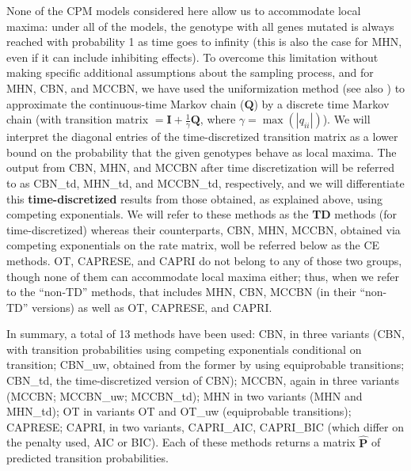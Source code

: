 \documentclass[a4paper,10pt]{article}
\newcommand{\idea}[1]{\textcolor{red}{#1}}
\begin{document}
None of the CPM models considered here allow us to accommodate local
maxima: under all of the models, the genotype with all genes mutated is
always reached with probability 1 as time goes to infinity (this is also
the case for MHN, even if it can include inhibiting effects). To overcome
this limitation without making specific additional assumptions about the
sampling process, and for MHN, CBN, and MCCBN, we have used the
uniformization method \cite{grassmann1977,vandijk2018} (see also
\cite[Fig.\ 6]{schill2020}) to approximate the continuous-time Markov
chain ($\mathbf{Q}$) by a discrete time Markov chain 
(with transition matrix $= \mathbf{I} + \frac{1}{\gamma}\mathbf{Q}$, where
$\gamma = \max(|q_{ii}|)$). We will interpret the diagonal entries of the
time-discretized transition matrix as a lower bound on the probability
that the given genotypes behave as local maxima. The output from CBN, MHN,
and MCCBN after time discretization will be referred to as CBN\_td,
MHN\_td, and MCCBN\_td, respectively, and we will differentiate this
\textbf{time-discretized} results from those obtained, as explained above,
using competing exponentials. We will refer to these methods as the
\textbf{TD} methods (for time-discretized) whereas their counterparts,
CBN, MHN, MCCBN, obtained via competing exponentials on the rate
matrix, woll be referred below as the CE methods. OT, CAPRESE, and CAPRI do not
belong to any of those two groups, though none of them can accommodate
local maxima either; thus, when we refer to the ``non-TD'' methods, that
includes MHN, CBN, MCCBN (in their ``non-TD'' versions) as well as OT,
CAPRESE, and CAPRI.




In summary, a total of 13 methods have been used: CBN, in three variants
(CBN, with transition probabilities using competing exponentials
conditional on transition; CBN\_uw, obtained from the former by using
equiprobable transitions; CBN\_td, the time-discretized version of CBN);
MCCBN, again in three variants (MCCBN; MCCBN\_uw; MCCBN\_td);
MHN in two variants (MHN and MHN\_td); OT in variants OT and OT\_uw
(equiprobable transitions); CAPRESE; CAPRI, in two variants, CAPRI\_AIC,
CAPRI\_BIC (which differ on the penalty used, AIC or BIC). Each of these
methods returns a matrix $\mathbf{\hat{P}}$ of predicted transition
probabilities. 
\end{document}
